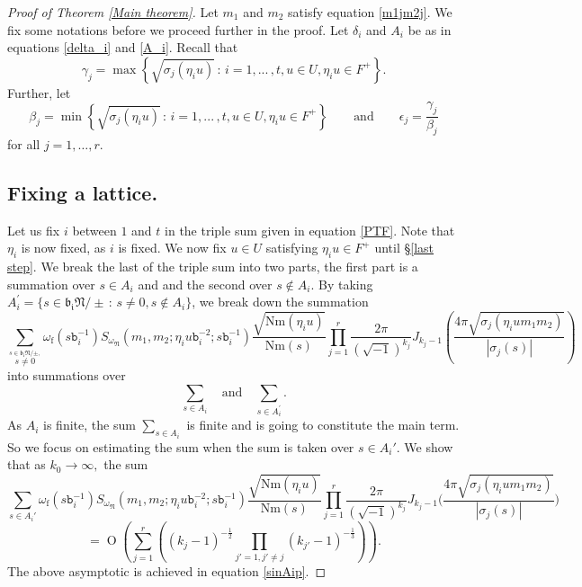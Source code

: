 \documentclass[reqno]{amsart}
\theoremstyle{plain}
\theoremstyle{definition}
\theoremstyle{remark}
\def\Nr{\mathrm{Nm}}
\def\b{\mathtt b}
\def\mp{m_{1}m_{2}}
\def\mc{m_{1},m_{2}}
\def\O{\operatorname{O}}
\begin{document}
\begin{proof}[Proof of Theorem \ref{Main theorem}]
Let $m_1$ and $m_2$ satisfy equation \eqref{m1jm2j}. 
We fix some notations before we proceed further in the proof.  
Let $\delta_i$ and $A_i$ be as in equations \eqref{delta_i} and \eqref{A_i}. 
 Recall that  $$\gamma_{j}=\max \left\{\sqrt{\sigma_{j}(\eta_i u)} \, : \,i =1,...\,,t  ,u\in U, \eta_i u\in F^+\right\} .$$ 
Further, let  $$\beta_{j}=\min \left\{\sqrt{\sigma_{j}(\eta_i u)} \, : \,i =1,...\,,t  ,u\in U, \eta_i u\in F^+\right\} \qquad \textrm{and} \qquad \epsilon_j=\frac{\gamma_j}{\beta_j} $$ 
for all $j=1,\dots, r$.

\subsection{Fixing a lattice.}\label{sec 2}
Let us fix $i$ between $1$ and $t$ in the triple sum given in equation \eqref{PTF}.  
Note that $\eta_i$ is now fixed, as $i$ is fixed. We now fix $u\in U$ satisfying $\eta_i u\in F^+$ until   \S \ref{last step}. 
We break the last of the triple sum into two parts, the first part is a summation over $s\in A_i$ and 
 and the second over $s\not\in A_i$.
By taking  $A_i^\prime=\{s\in  \mathfrak{b_i}\mathfrak{N}/\pm\, : \, s\neq 0, s\notin A_i\}$, we break down the summation 
   $$ 
 \sum_{\stackrel{s\in  \mathfrak{b_i}\mathfrak{N}/\pm,}{s\neq 0} }\omega_{\mathrm{f}}(s\b_i^{-1} ) S_{\omega_\mathfrak{N}} (m_{1},m_{2};\eta_i u \b_i^{-2};s\b_i^{-1})
 \frac{\sqrt{\Nr(\eta_i u)}}{\Nr(s)}
 \prod_{j=1}^r\frac{2\pi}{(\sqrt{-1})^{k_j}}J_{k_j-1} \left(  \frac{4 \pi\sqrt{\sigma_j (\eta_i u m_{1}m_{2} )}}{|\sigma_j(s)|}\right) 
    $$  
into summations over 
    $$  \sum_{s\in A_i } \quad \textrm{and} \quad  \sum_{s\in A_i^\prime }.$$
As $A_i$ is finite, the sum $\sum_{s\in A_i }$
is finite and is going to constitute the main term. 
So we focus on estimating the sum when the sum is taken over $s\in A_i'.$
 We show that as $k_0\rightarrow \infty,$ the sum   
\begin{equation}\label{Aiprime}
\sum_{s\in A_i' }\omega_{\mathrm{f}}(s\b_i^{-1} ) S_{\omega_\mathfrak{N}} (\mc;\eta_i u \b_i^{-2};s\b_i^{-1})
 \frac{\sqrt{\Nr(\eta_i u)}}{\Nr(s)}
 \prod_{j=1}^r\frac{2\pi}{(\sqrt{-1})^{k_j}}J_{k_j-1} \Big(  \frac{4 \pi\sqrt{\sigma_j (\eta_i u \mp )}}{|\sigma_j(s)|}\Big)
\end{equation}
$$ =\O\left(\sum_{j=1}^r \left( (k_{j}-1)^{-\frac{1}{2}}\prod_{j'=1,j'\neq j}(k_{j'}-1)^{-\frac{1}{3}}\right)\right).$$
   The above asymptotic is achieved in  equation \eqref{sinAip}.


\end{proof}
\end{document}

